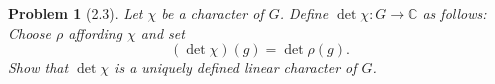 
\usepackage[T1]{fontenc}


\usepackage{thmtools}
\usepackage{fancyhdr}

\usepackage{csquotes}

\usepackage{polynom}

\newsavebox{\myheadbox}
{
\cfoot{\thepage}
}
\fancyhf{}
{
\cfoot{\thepage}
}

\pagestyle{normalpage}


\date{}

\renewcommand{\C}{\mathbb{C}}
\newcommand{\GL}{\mathsf{GL}}
\newcommand{\Z}{\mathbb{Z}}
\renewcommand{\R}{\mathbb{R}}
\newcommand{\Res}{\mathsf{Res}^{D_{2n}}_{\langle x\rangle}}
\newcommand{\triv}{\mathbb{1}}
\newcommand{\Char}{\mathsf{Char}}
\newcommand{\Fix}{\mathsf{Fix}}
\newcommand{\Span}{\mathsf{Span}}
\newcommand{\Tr}{\mathsf{Tr}}
\newcommand{\Ker}{\mathsf{Ker}}
\renewcommand{\Im}{\mathsf{Im}}
\newcommand{\Cent}{\mathsf{Cent}}
\newcommand{\Irr}{\mathsf{Irr}}


\thispagestyle{firstpage}
\theoremstyle{normalhead}
\newtheorem{problem}{Problem}
\newtheorem{lemma}{Lemma}

\begin{problem}[2.3]
Let $\chi$ be a character of $G$. Define $\det {\chi}: G \to \C$ as follows: Choose $\rho$ affording $\chi$ and set
\[
(\det{\chi})(g) = \det{\rho(g)}.
\]
Show that $\det{\chi}$ is a uniquely defined linear character of $G$.

\end{problem}

